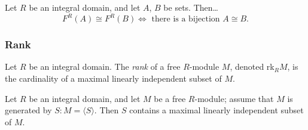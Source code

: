 \begin{corollary}
Let $R$ be an integral domain, and let $A$, $B$ be sets. Then\dots
$$F^R(A) \cong F^R(B) \Leftrightarrow \textrm{ there is a bijection } A \cong B.$$
\end{corollary}

\subsubsection{Rank}\label{rank}
Let $R$ be an integral domain. The \emph{rank} of a free $R$-module $M$, denoted rk$_R M$, is the cardinality of a maximal linearly independent
subset of $M$.

\begin{proposition}
Let $R$ be an integral domain, and let $M$ be a free $R$-module; assume that $M$ is generated by $S: M = \langle S \rangle$. Then
$S$ contains a maximal linearly independent subset of $M$.
\end{proposition}